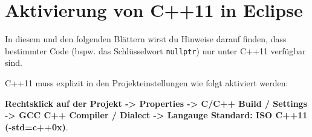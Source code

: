 \section*{Aktivierung von C++11 in Eclipse}

In diesem und den folgenden Blättern wirst du Hinweise darauf finden, dass bestimmter Code (bspw. das Schlüsselwort \texttt{nullptr}) nur unter C++11 verfügbar sind.

C++11 muss explizit in den Projekteinstellungen wie folgt aktiviert werden:

\textbf{Rechtsklick auf der Projekt -> Properties -> C/C++ Build / Settings -> GCC C++ Compiler / Dialect -> Langauge Standard: ISO C++11 (-std=c++0x)}.